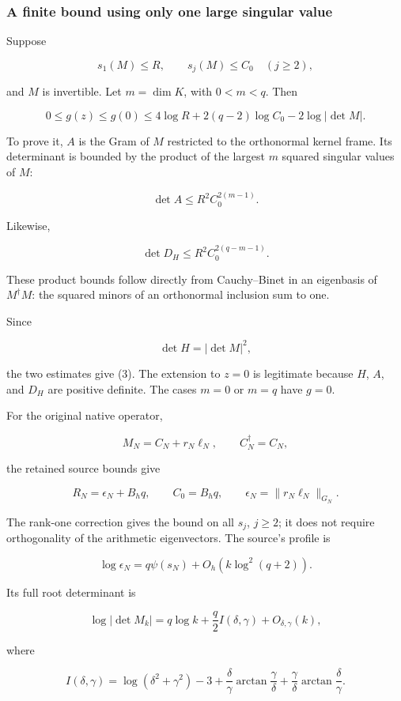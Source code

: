 \documentclass[11pt]{article}
\begin{document}
\subsubsection{A finite bound using only one large singular value}\label{a-finite-bound-using-only-one-large-singular-value}

Suppose

\[
s_1(M)\le R,\qquad s_j(M)\le C_0\quad(j\ge2),
\]

and \(M\) is invertible. Let \(m=\dim K\), with \(0<m<q\). Then

\[
\boxed{
0\le g(z)\le g(0)
\le
4\log R+2(q-2)\log C_0-2\log|\det M|.
}
\tag{3}
\]

To prove it, \(A\) is the Gram of \(M\) restricted to the orthonormal kernel frame. Its determinant is bounded by the product of the largest \(m\) squared singular values of \(M\):

\[
\det A\le R^2C_0^{2(m-1)}.
\]

Likewise,

\[
\det D_H\le R^2C_0^{2(q-m-1)}.
\]

These product bounds follow directly from Cauchy--Binet in an eigenbasis of \(M^\dagger M\): the squared minors of an orthonormal inclusion sum to one.

Since

\[
\det H=|\det M|^2,
\]

the two estimates give (3). The extension to \(z=0\) is legitimate because \(H\), \(A\), and \(D_H\) are positive definite. The cases \(m=0\) or \(m=q\) have \(g=0\).

For the original native operator,

\[
M_N=C_N+r_N\ell_N,\qquad C_N^\dagger=C_N,
\]

the retained source bounds give

\[
R_N=\epsilon_N+B_hq,\qquad C_0=B_hq,
\qquad \epsilon_N=\|r_N\ell_N\|_{G_N}.
\]

The rank-one correction gives the bound on all \(s_j\), \(j\ge2\); it does not require orthogonality of the arithmetic eigenvectors. The source's profile is

\[
\log\epsilon_N=q\psi(s_N)+O_h(k\log^2(q+2)).
\]

Its full root determinant is

\[
\log|\det M_k|
=q\log k+\frac q2I(\delta,\gamma)+O_{\delta,\gamma}(k),
\]

where

\[
I(\delta,\gamma)
=\log(\delta^2+\gamma^2)-3
+\frac{\delta}{\gamma}\arctan\frac{\gamma}{\delta}
+\frac{\gamma}{\delta}\arctan\frac{\delta}{\gamma}.
\]
\end{document}
